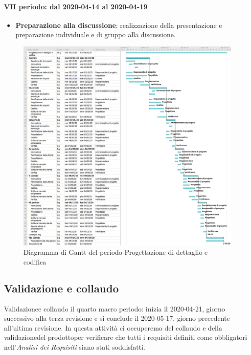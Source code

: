 \paragraph{VII periodo: dal 2020-04-14 al 2020-04-19}
\begin{itemize}
	\item \textbf{Preparazione alla discussione}: realizzazione della presentazione e preparazione individuale e di gruppo alla discussione.
\end{itemize}
\begin{landscape}
	\begin{figure}
		\includegraphics[width=160mm]{./gantt/Progettazione di dettaglio e codifica.png}
		\caption{Diagramma di Gantt del periodo Progettazione di dettaglio e codifica}
	\end{figure}
\end{landscape}
\pagebreak

\subsection{Validazione e collaudo}
Validazione\glosp e collaudo il quarto macro periodo: inizia il 2020-04-21, giorno successivo alla terza revisione e si conclude il 2020-05-17, giorno precedente all'ultima revisione. In questa attività ci occuperemo del collaudo e della validazione\glosp del prodotto\glosp per verificare che tutti i requisiti definiti come obbligatori nell'\textit{Analisi dei Requisiti} siano stati soddisfatti.

